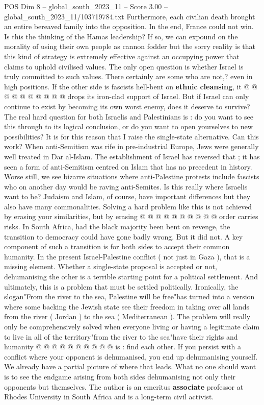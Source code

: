 \begin{textsample}{POS Dim 8 – global\_south\_2023\_11 – Score 3.00 – global\_south\_2023\_11/103719784.txt}
Furthermore, each civilian death brought an entire bereaved family into the opposition.
In the end, France could not win.
Is this the thinking of the Hamas leadership?
If so, we can expound on the morality of using their own people as cannon fodder but the sorry reality is that this kind of strategy is extremely effective against an occupying power that claims to uphold civilised values.
The only open question is whether Israel is truly committed to such values.
There certainly are some who are not,? even in high positions.
If the other side is fascists hell-bent on \textbf{ethnic} \textbf{cleansing}, it @ @ @ @ @ @ @ @ @ @ drops its iron-clad support of Israel.
But if Israel can only continue to exist by becoming its own worst enemy, does it deserve to survive?
The real hard question for both Israelis and Palestinians is : do you want to see this through to its logical conclusion, or do you want to open yourselves to new possibilities?
It is for this reason that I raise the single-state alternative.
Can this work?
When anti-Semitism was rife in pre-industrial Europe, Jews were generally well treated in Dar al-Islam.
The establishment of Israel has reversed that ; it has seen a form of anti-Semitism centred on Islam that has no precedent in history.
Worse still, we see bizarre situations where anti-Palestine protests include fascists who on another day would be raving anti-Semites.
Is this really where Israelis want to be?
Judaism and Islam, of course, have important differences but they also have many commonalities.
Solving a hard problem like this is not achieved by erasing your similarities, but by erasing @ @ @ @ @ @ @ @ @ @ order carries risks.
In South Africa, had the black majority been bent on revenge, the transition to democracy could have gone badly wrong.
But it did not.
A key component of such a transition is for both sides to accept their common humanity.
In the present Israel-Palestine conflict ( not just in Gaza ), that is a missing element.
Whether a single-state proposal is accepted or not, dehumanising the other is a terrible starting point for a political settlement.
And ultimately, this is a problem that must be settled politically.
Ironically, the slogan"From the river to the sea, Palestine will be free"has turned into a version where some backing the Jewish state see their freedom in taking over all lands from the river ( Jordan ) to the sea ( Mediterranean ).
The problem will really only be comprehensively solved when everyone living or having a legitimate claim to live in all of the territory"from the river to the sea"have their rights and humanity @ @ @ @ @ @ @ @ @ @ is : find each other.
If you persist with a conflict where your opponent is dehumanised, you end up dehumanising yourself.
We already have a partial picture of where that leads.
What no one should want is to see the endgame arising from both sides dehumanising not only their opponents but themselves.
The author is an emeritus \textbf{associate} professor at Rhodes University in South Africa and is a long-term civil activist.

\end{textsample}
